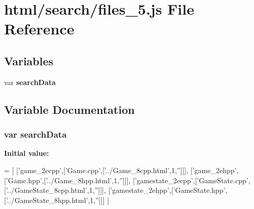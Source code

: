 \section{html/search/files\-\_\-5.js File Reference}
\label{files__5_8js}
\subsection*{Variables}
\begin{DoxyCompactItemize}
\item 
var {\bf search\-Data}
\end{DoxyCompactItemize}


\subsection{Variable Documentation}
\subsubsection[{search\-Data}]{\setlength{\rightskip}{0pt plus 5cm}var search\-Data}\label{files__5_8js_ad01a7523f103d6242ef9b0451861231e}
{\bfseries Initial value\-:}
\begin{DoxyCode}
=
[
  [\textcolor{stringliteral}{'game\_2ecpp'},[\textcolor{stringliteral}{'Game.cpp'},[\textcolor{stringliteral}{'../Game\_8cpp.html'},1,\textcolor{stringliteral}{''}]]],
  [\textcolor{stringliteral}{'game\_2ehpp'},[\textcolor{stringliteral}{'Game.hpp'},[\textcolor{stringliteral}{'../Game\_8hpp.html'},1,\textcolor{stringliteral}{''}]]],
  [\textcolor{stringliteral}{'gamestate\_2ecpp'},[\textcolor{stringliteral}{'GameState.cpp'},[\textcolor{stringliteral}{'../GameState\_8cpp.html'},1,\textcolor{stringliteral}{''}]]],
  [\textcolor{stringliteral}{'gamestate\_2ehpp'},[\textcolor{stringliteral}{'GameState.hpp'},[\textcolor{stringliteral}{'../GameState\_8hpp.html'},1,\textcolor{stringliteral}{''}]]]
]
\end{DoxyCode}
